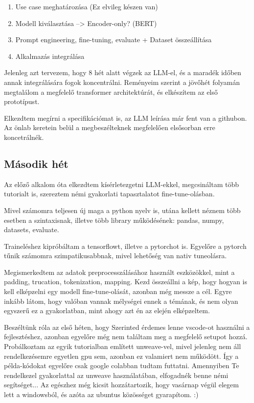 \documentclass{article}
\begin{document}
\begin{enumerate}
  \item Use case meghatározása  (Ez elvileg készen van)
  \item Modell kiválasztása  --> Encoder-only? (BERT)
  \item Prompt engineering, fine-tuning, evaluate   + Dataset összeállítása
  \item Alkalmazás integrálása
\end{enumerate}

Jelenleg azt tervezem, hogy 8 hét alatt végzek az LLM-el, és a maradék időben annak
integrálására fogok koncentrálni.
Reményeim szerint a jövőhét folyamán megtalálom a megfelelő transformer architektúrát,
és elkészítem az első prototípust.

Elkezdtem megírni a specifikációmat is, az LLM leírása már fent van a githubon.
Az önlab keretein belül a megbeszélteknek megfelelően elsősorban erre koncetrálnék.

\subsection{Második hét}
Az előző alkalom óta elkezdtem kísérletezgetni LLM-ekkel, megcsináltam több tutorialt is,
szereztem némi gyakorlati tapasztalatot fine-tune-olásban. 

Mivel számomra teljesen új maga a python nyelv is, utána kellett néznem több esetben 
a szintaxisnak, illetve több library működésének: pandas, numpy, datasets, evaluate.

Traineléshez kipróbáltam a tensorflowt, illetve a pytorchot is. Egyelőre a pytorch tűnik számomra szimpatikusabbnak,
mivel lehetőség van nativ tuneolásra.

Megismerkedtem az adatok preprocesszálásához használt eszközökkel, mint a padding, trucation, tokenization, mapping.
Kezd összeállni a kép, hogy hogyan is kell elképzelni egy modell fine-tune-olását, azonban még messze a cél.
Egyre inkább látom, hogy valóban vannak mélységei ennek a témának, és nem olyan egyszerű ez a gyakorlatban, 
mint ahogy azt én az elején elképzeltem. 

Beszéltünk róla az első héten, hogy Szerinted érdemes lenne vscode-ot használni a fejlesztéshez, 
azonban egyelőre még nem találtam meg a megfelelő setupot hozzá.
Probálkoztam az egyik tutorialban említett unweave-vel, mivel jelenleg nem áll rendelkezésemre egyetlen gpu sem, 
azonban ez valamiert nem működött. Így a példa-kódokat egyelőre csak google colabban tudtam futtatni.
Amennyiben Te rendelkezel gyakorlattal az unweave használatában, elfogadnék benne némi segítséget... 
Az egészhez még kicsit hozzátartozik, hogy vasárnap végül elegem lett a windowsból, és azóta az ubuntus közösséget gyarapítom. :)
\end{document}
